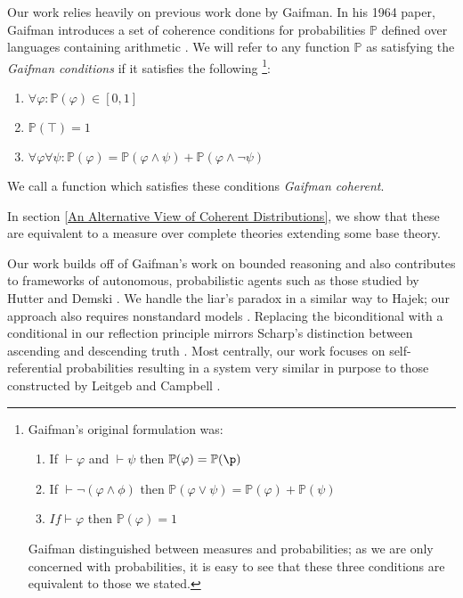 \documentclass[12pt]{article}
\newcommand{\PP}{\mathbb{P}}
\theoremstyle{plain}
\theoremstyle{definition}
\theoremstyle{remark}
\begin{document}
Our work relies heavily on previous work done by Gaifman. In his 1964 paper, Gaifman introduces a set of coherence conditions for probabilities $\PP$ defined over languages containing arithmetic \cite{gaifman64}. We will refer to any function $\mathbb{P}$ as satisfying the \emph{Gaifman conditions} if it satisfies the following
\footnote{Gaifman's original formulation was:
\begin{enumerate}
\item If $\vdash \varphi$ and $\vdash \psi$ then $\PP(\varphi)=\PP(\p)$
\item If $\vdash \neg (\varphi \wedge \phi)$ then $\PP(\varphi \vee \psi) = \PP(\varphi) + \PP(\psi)$
\item $If \vdash \varphi$ then $\PP(\varphi) = 1$
\end{enumerate}
Gaifman distinguished between measures and probabilities; as we are only concerned with probabilities, it is easy to see that these three conditions are equivalent to those we stated.
}:
\begin{enumerate}
\item $\forall \varphi: \PP(\varphi) \in [0,1]$
\item $\PP(\top) = 1$
\item $\forall \varphi \forall \psi: \PP(\varphi) = \PP(\varphi \wedge \psi) + \PP(\varphi \wedge \neg \psi)$
\end{enumerate}

We call a function which satisfies these conditions \emph{Gaifman coherent}.

In section \ref{An Alternative View of Coherent Distributions}, we show that these are equivalent to a measure over complete theories extending some base theory.


% 


Our work builds off of Gaifman's work on bounded reasoning \cite{gaifman04} and also contributes 
to frameworks of autonomous, probabilistic agents such as those studied by Hutter and Demski
\cite{hutter13,demski12}.
We handle the liar's paradox in a similar way to Hajek; our approach also requires nonstandard models \cite{hajek98}.
Replacing the biconditional with a conditional in our reflection principle mirrors Scharp's distinction between ascending and descending truth \cite{scharp13}.
Most centrally, our work focuses on self-referential probabilities resulting in a system very similar in purpose to those constructed by Leitgeb and Campbell \cite{leitgeb08,leitgeb12a,leitgeb12b,campbell14}.
\end{document}
